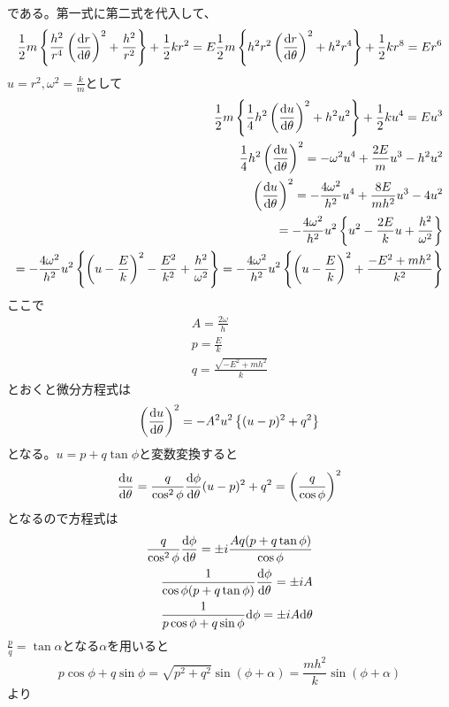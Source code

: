 	である。第一式に第二式を代入して、
	\begin{align*}
		\frac{1}{2}m\mlr{ \frac{h^2}{r^4}\lr{\de[r]{\theta}}^2 + \frac{h^2}{r^2} } + \frac{1}{2}kr^2 = E
		\frac{1}{2}m\mlr{ h^2r^2\lr{\de[r]{\theta}}^2 + h^2r^4 } + \frac{1}{2}kr^8 = Er^6\\
	\end{align*}
	$u = r^2, \omega^2 = \frac{k}{m}$として
	\begin{align*}
		\frac{1}{2}m\mlr{ \frac{1}{4}h^2\lr{\de[u]{\theta}}^2 + h^2u^2 } + \frac{1}{2}ku^4 = Eu^3\\
		\frac{1}{4}h^2\lr{\de[u]{\theta}}^2 = - \omega^2u^4 + \frac{2E}{m}u^3 - h^2u^2\\
		\lr{\de[u]{\theta}}^2 = - \frac{4\omega^2}{h^2}u^4 + \frac{8E}{mh^2}u^3 - 4u^2\\
		= - \frac{4\omega^2}{h^2}u^2 \mlr{ u^2 - \frac{2E}{k}u + \frac{h^2}{\omega^2} }\\
		= - \frac{4\omega^2}{h^2}u^2 \mlr{ \lr{ u - \frac{E}{k} }^2 - \frac{E^2}{k^2} + \frac{h^2}{\omega^2} }
		= - \frac{4\omega^2}{h^2}u^2 \mlr{ \lr{ u - \frac{E}{k} }^2 + \frac{- E^2 + mh^2}{k^2} }
	\end{align*}
	ここで
	\begin{gather*}
		A = \frac{2\omega}{h}\\
		p = \frac{E}{k}\\
		q = \frac{\sqrt{-E^2 + mh^2}}{k}
	\end{gather*}
	とおくと微分方程式は
		\[\lr{\de[u]{\theta}}^2 = - A^2u^2\mlr{ (u - p)^2 + q^2 }\]
	となる。$u = p + q\tan\phi$と変数変換すると
	\begin{align*}
		\de[u]{\theta} = \frac{q}{\cos^2\phi}\de[\phi]{\theta}
		(u - p)^2 + q^2 = \lr{ \frac{q}{\cos\phi} }^2
	\end{align*}
	となるので方程式は
	\begin{align*}
		\frac{q}{\cos^2\phi}\de[\phi]{\theta} = \pm i\frac{Aq(p + q\tan\phi)}{\cos\phi}\\
		\frac{1}{\cos\phi(p + q\tan\phi)}\de[\phi]{\theta} = \pm iA\\
		\frac{1}{p\cos\phi + q\sin\phi}\d\phi = \pm iA\d\theta\\
	\end{align*}
	$\frac{p}{q} = \tan\alpha$となる$\alpha$を用いると
		\[p\cos\phi + q\sin\phi = \sqrt{p^2 + q^2}\sin(\phi + \alpha) = \frac{mh^2}{k}\sin(\phi + \alpha)\]
	より
